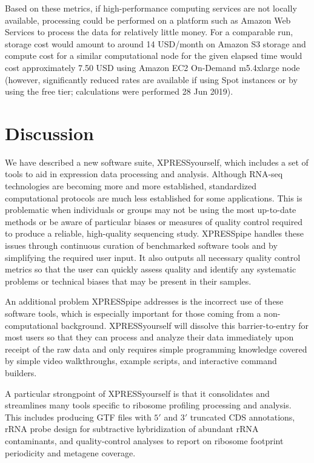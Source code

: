 \documentclass[10pt, oneside]{article}
\begin{document}
Based on these metrics, if high-performance computing services are not locally available, processing could be performed on a platform such as Amazon Web Services to process the data for relatively little money. For a comparable run, storage cost would amount to around 14 USD/month on Amazon S3 storage and compute cost for a similar computational node for the given elapsed time would cost approximately 7.50 USD using Amazon EC2 On-Demand m5.4xlarge node (however, significantly reduced rates are available if using Spot instances or by using the free tier; calculations were performed 28 Jun 2019). \par


\section{Discussion}
We have described a new software suite, XPRESSyourself, which includes a set of tools to aid in expression data processing and analysis. Although RNA-seq technologies are becoming more and more established, standardized computational protocols are much less established for some applications. This is problematic when individuals or groups may not be using the most up-to-date methods or be aware of particular biases or measures of quality control required to produce a reliable, high-quality sequencing study. XPRESSpipe handles these issues through continuous curation of benchmarked software tools and by simplifying the required user input. It also outputs all necessary quality control metrics so that the user can quickly assess quality and identify any systematic problems or technical biases that may be present in their samples. \par

An additional problem XPRESSpipe addresses is the incorrect use of these software tools, which is especially important for those coming from a non-computational background. XPRESSyourself will dissolve this barrier-to-entry for most users so that they can process and analyze their data immediately upon receipt of the raw data and only requires simple programming knowledge covered by simple video walkthroughs, example scripts, and interactive command builders. \par

A particular strongpoint of XPRESSyourself is that it consolidates and streamlines many tools specific to ribosome profiling processing and analysis. This includes producing GTF files with $5'$ and $3'$ truncated CDS annotations, rRNA probe design for subtractive hybridization of abundant rRNA contaminants, and quality-control analyses to report on ribosome footprint periodicity and metagene coverage. \par
\end{document}
